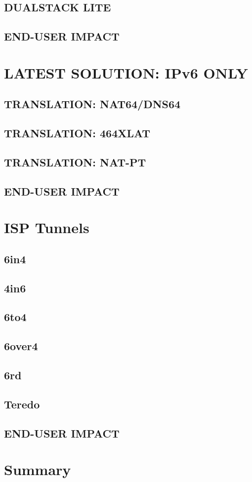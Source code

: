 \documentclass[format=sigconf, natbib=true, nonacm=true]{acmart}
\begin{document}
    \subsection{DUALSTACK LITE}
    \lipsum[25-28]
    \subsection*{END-USER IMPACT}
    \lipsum[18-22]

    \section{LATEST SOLUTION: IPv6 ONLY}
    \lipsum[21]
    \subsection{TRANSLATION: NAT64/DNS64}
    \lipsum[22-24]
    \subsection{TRANSLATION: 464XLAT}
    \lipsum[24-26]
    \subsection{TRANSLATION: NAT-PT}
    \lipsum[26-28]
    \subsection*{END-USER IMPACT}
    \lipsum[18-21]

    \section{ISP Tunnels}
    \lipsum[21]
    \subsection{6in4}
    \lipsum[22-24]
    \subsection{4in6}
    \lipsum[24-26]
    \subsection{6to4}
    \lipsum[26-28]
    \subsection*{6over4}
    \lipsum[18-21]
    \subsection{6rd}
    \lipsum[26-28]
    \subsection*{Teredo}
    \lipsum[18-21]
    \subsection*{END-USER IMPACT}
    \lipsum[18-22]

    \section{Summary}
    \lipsum[100-104]

    
    
\end{document}
